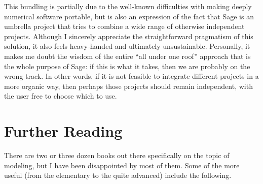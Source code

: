 This bundling is partially due to the well-known difficulties with
making deeply numerical software portable, but is also an expression
of the fact that Sage is an umbrella project that tries to combine a
wide range of otherwise independent projects. Although I sincerely
appreciate the straightforward pragmatism of this solution, it also
feels heavy-handed and ultimately unsustainable.  Personally, it makes
me doubt the wisdom of the entire ``all under one roof'' approach that
is the whole purpose of Sage: if this is what it takes, then we are
probably on the wrong track. In other words, if it is not feasible to
integrate different projects in a more organic way, then perhaps those
projects should remain independent, with the user free to choose which
to use.



\section{Further Reading}

There are two or three dozen books out there specifically on the 
topic of modeling, but I have been disappointed by most of them.
Some of the more useful (from the elementary to the quite advanced)
include the following.

